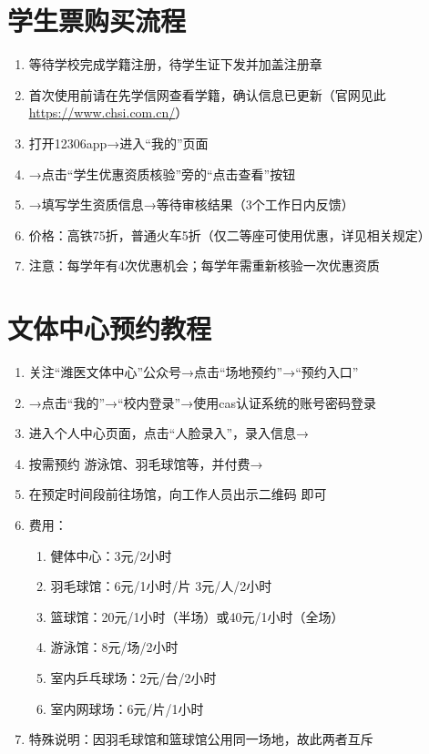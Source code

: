 \section[学生票购买流程]{学生票购买\footnotemark 流程}
\begin{enumerate}
    \item 等待学校完成学籍注册，待学生证下发并加盖注册章
    \item 首次使用前请在先学信网查看学籍，确认信息已更新（官网见此\uline{\href{https://www.chsi.com.cn/}{https://www.chsi.com.cn/}}）
    \item 打开12306app→进入“我的”页面
    \item →点击“学生优惠资质核验”旁的“点击查看”按钮
    \item →填写学生资质信息→等待审核结果（3个工作日内反馈）
    \item 价格：高铁75折，普通火车5折（仅二等座可使用优惠，详见相关规定）
    \item 注意：每学年\footnotemark 有4次优惠机会；每学年需重新核验一次优惠资质
\end{enumerate}

\section[文体中心预约教程]{文体中心预约教程}
\label{sports_center}
\begin{enumerate}
    \item 关注“潍医文体中心”公众号→点击“场地预约”→“预约入口”
    \item →点击“我的”→“校内登录”→使用cas认证系统的账号密码登录
    \item 进入个人中心页面，点击“人脸录入”，录入信息→
    \item 按需预约 游泳馆、羽毛球馆等，并付费→
    \item 在预定时间段前往场馆，向工作人员出示二维码 即可
    \item 费用：
          \begin{enumerate}[（1）]
              \item 健体中心：3元/2小时
              \item 羽毛球馆\footnotemark：6元/1小时/片 3元/人/2小时
              \item 篮球馆：20元/1小时（半场）或40元/1小时（全场）
              \item 游泳馆\footnotemark：8元/场/2小时
              \item 室内乒乓球场：2元/台/2小时
              \item 室内网球场：6元/片/1小时
          \end{enumerate}
    \item 特殊说明：因羽毛球馆和篮球馆公用同一场地，故此两者互斥
\end{enumerate}
